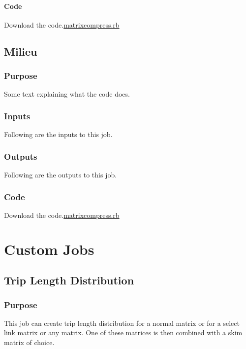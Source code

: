 \documentclass[
  letterpaper,
  DIV=11,
  numbers=noendperiod]{scrreprt}
\begin{document}
\subsection{Code}\label{code-6}

Download the code.\href{../../first.rb}{matrixcompress.rb}

\chapter{Milieu}\label{milieu}

\section{Purpose}

Some text explaining what the code does.

\section{Inputs}

Following are the inputs to this job.

\section{Outputs}

Following are the outputs to this job.

\section{Code}

Download the code.\href{../first.rb}{matrixcompress.rb}

\part{Custom Jobs}

\chapter{Trip Length Distribution}\label{trip-length-distribution}

\section{Purpose}\label{purpose-8}

This job can create trip length distribution for a normal matrix or for
a select link matrix or any matrix. One of these matrices is then
combined with a skim matrix of choice.
\end{document}
